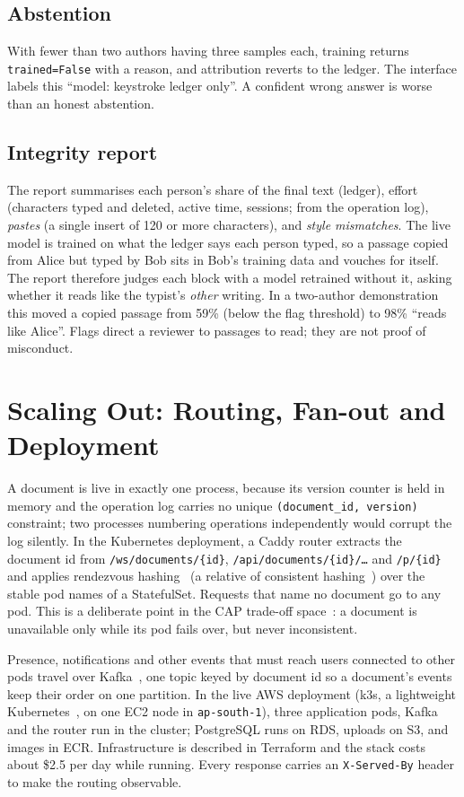 \documentclass[conference]{IEEEtran}
\begin{document}
\subsection{Abstention}
With fewer than two authors having three samples each, training returns \texttt{trained=False} with a reason, and attribution reverts to the ledger. The interface labels this ``model: keystroke ledger only''. A confident wrong answer is worse than an honest abstention.

\subsection{Integrity report}
The report summarises each person's share of the final text (ledger), effort (characters typed and deleted, active time, sessions; from the operation log), \emph{pastes} (a single insert of 120 or more characters), and \emph{style mismatches}. The live model is trained on what the ledger says each person typed, so a passage copied from Alice but typed by Bob sits in Bob's training data and vouches for itself. The report therefore judges each block with a model retrained without it, asking whether it reads like the typist's \emph{other} writing. In a two-author demonstration this moved a copied passage from 59\% (below the flag threshold) to 98\% ``reads like Alice''. Flags direct a reviewer to passages to read; they are not proof of misconduct.

\section{Scaling Out: Routing, Fan-out and Deployment}
A document is live in exactly one process, because its version counter is held in memory and the operation log carries no unique \texttt{(document\_id, version)} constraint; two processes numbering operations independently would corrupt the log silently. In the Kubernetes deployment, a Caddy router extracts the document id from \texttt{/ws/documents/\{id\}}, \texttt{/api/documents/\{id\}/\ldots} and \texttt{/p/\{id\}} and applies rendezvous hashing~\cite{thaler1998} (a relative of consistent hashing~\cite{karger1997}) over the stable pod names of a StatefulSet. Requests that name no document go to any pod. This is a deliberate point in the CAP trade-off space~\cite{brewer2000,gilbert2002}: a document is unavailable only while its pod fails over, but never inconsistent.

Presence, notifications and other events that must reach users connected to other pods travel over Kafka~\cite{kreps2011}, one topic keyed by document id so a document's events keep their order on one partition. In the live AWS deployment (k3s, a lightweight Kubernetes~\cite{burns2016}, on one EC2 node in \texttt{ap-south-1}), three application pods, Kafka and the router run in the cluster; PostgreSQL runs on RDS, uploads on S3, and images in ECR. Infrastructure is described in Terraform and the stack costs about \$2.5 per day while running. Every response carries an \texttt{X-Served-By} header to make the routing observable.
\end{document}
